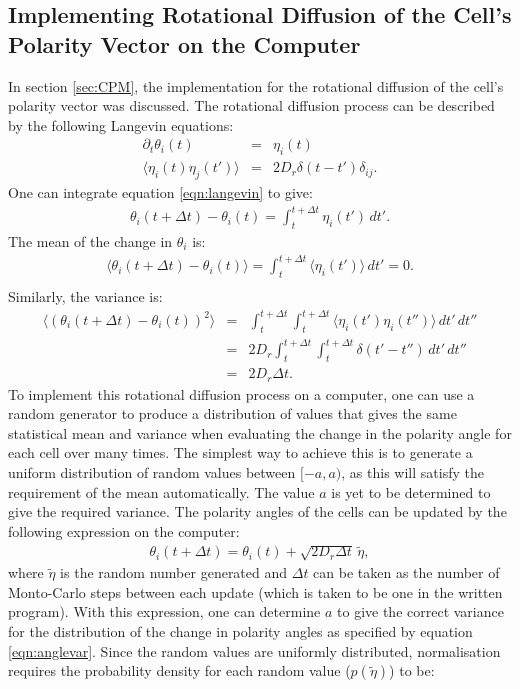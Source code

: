 \documentclass[a4paper,12pt]{article}
\newcommand{\inc}{\Delta}
\begin{document}
\subsection{Implementing Rotational Diffusion of the Cell's Polarity Vector on the Computer}
\label{app:rotatediff}
In section \ref{sec:CPM}, the implementation for the rotational diffusion of the cell's polarity vector was discussed. The rotational diffusion process can be described by the following Langevin equations:
\begin{eqnarray}
\partial_t\theta_i(t) & = & \eta_i(t)\label{eqn:langevin}\\
\langle{\eta_i(t)\eta_j(t')\rangle} & = & 2D_r\delta(t-t')\delta_{ij}.
\end{eqnarray}
One can integrate equation \ref{eqn:langevin} to give:
\begin{eqnarray}
\theta_i(t+\inc t) - \theta_i(t) = \int_{t}^{t+\inc t} \eta_i (t')\,dt'.
\end{eqnarray}
The mean of the change in $\theta_i$ is:
\begin{eqnarray}
\langle\theta_i(t+\inc t) - \theta_i(t)\rangle = \int_{t}^{t+\inc t} \langle\eta_i (t')\rangle\,dt' = 0.\\
\end{eqnarray}
Similarly, the variance is:
\begin{eqnarray}
\langle\left(\theta_i(t+\inc t) - \theta_i(t)\right)^2\rangle & = & \int_{t}^{t+\inc t}\int_{t}^{t+\inc t} \langle\eta_i (t')\eta_i(t'')\rangle\,dt'\,dt''\\
& = & 2D_r \int_{t}^{t+\inc t}\int_{t}^{t+\inc t} \delta(t'-t'')\,dt'\,dt''\\
& = & 2D_r\inc t\label{eqn:anglevar}.
\end{eqnarray}
To implement this rotational diffusion process on a computer, one can use a random generator to produce a distribution of values that gives the same statistical mean and variance when evaluating the change in the polarity angle for each cell over many times. The simplest way to achieve this is to generate a uniform distribution of random values between $[-a,a)$, as this will satisfy the requirement of the mean automatically. The value $a$ is yet to be determined to give the required variance. The polarity angles of the cells can be updated by the following expression on the computer:
\begin{eqnarray}
\theta_i (t + \inc t) = \theta_i (t) + \sqrt{2 D_r \inc t}\, \tilde\eta,
\end{eqnarray}
where $\tilde\eta$ is the random number generated and $\inc t$ can be taken as the number of Monto-Carlo steps between each update (which is taken to be one in the written program). With this expression, one can determine $a$ to give the correct variance for the distribution of the change in polarity angles as specified by equation \ref{eqn:anglevar}. Since the random values are uniformly distributed, normalisation requires the probability density for each random value ($p(\tilde\eta)$) to be:
\end{document}
